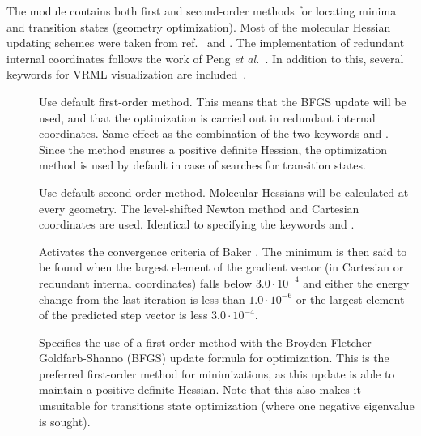 The  module contains both first and second-order methods
for locating minima and transition states (geometry optimization).
Most of the molecular Hessian updating schemes were taken from
ref.~\cite{thkrprt95} and \cite{Fletcher}.
The implementation of redundant internal coordinates
follows the work of Peng {\it et al.\/}~\cite{cppyahbsmjfjcc17}.
In addition to this, several keywords for VRML visualization are included~\cite{VRML}.

\begin{description}

\item[]
Use default first-order method.
This means that the BFGS update will
be used, and that the optimization is carried out in redundant internal
coordinates. Same effect as the
combination of the two keywords  and . Since the
 method ensures a positive definite Hessian, the
 optimization method is used by default in case of
searches for transition states.

\item[]
Use default second-order method.
Molecular Hessians will be calculated at every
geometry. The level-shifted Newton method and
Cartesian coordinates are used. Identical
to specifying the keywords  and .

\item[]
Activates the convergence criteria of Baker \cite{Baker}. The minimum
is then said to be found when the largest element of the gradient
vector (in Cartesian or redundant internal coordinates) falls below
$3.0\cdot 10^{-4}$ and either the energy change from the last
iteration is less than $1.0\cdot 10^{-6}$ or the largest element of
the predicted step vector is less $3.0\cdot 10^{-4}$.

\item[]
Specifies the use of a first-order method
with the Broyden-Fletcher-Goldfarb-Shanno (BFGS)
update
formula for optimization. This is the
preferred first-order method for minimizations, as this update is able
to maintain a positive definite Hessian. Note that this also makes it
unsuitable for transitions state optimization (where one negative
eigenvalue is sought).


\end{description}
